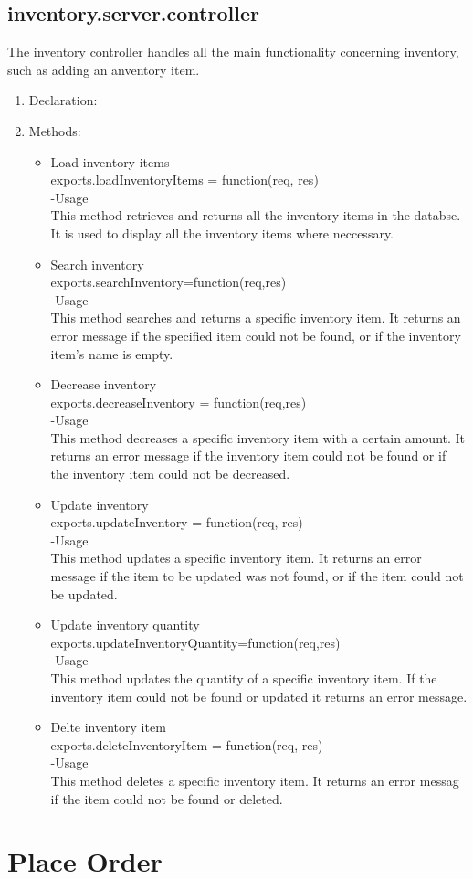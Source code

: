 \documentclass[a4paper,12pt]{article}
\begin{document}
\subsection{inventory.server.controller}
 The inventory controller handles all the main functionality concerning inventory, such as adding an anventory item.
 \begin{enumerate}
 \item Declaration:
 \item Methods:
 	\begin{itemize}
 	\item Load inventory items\\
 	exports.loadInventoryItems = function(req, res)\\
 	-Usage\\
 	This method retrieves and returns all the inventory items in the databse. It is used to display all the inventory items where neccessary.
 	\item Search inventory\\
 	exports.searchInventory=function(req,res)\\
 	-Usage\\
 	This method searches and returns a specific inventory item. It returns an error message if the specified item could not be found, or if the inventory item's name is empty.
 	\item Decrease inventory\\
 	exports.decreaseInventory = function(req,res)\\
 	-Usage\\
 	This method decreases a specific inventory item with a certain amount. It returns an error message if the inventory item could not be found or if the inventory item could not be decreased.
 	\item Update inventory\\
 	exports.updateInventory = function(req, res)\\
 	-Usage\\
 	This method updates a specific inventory item. It returns an error message if the item to be updated was  not found, or if the item could not be updated.
 	\item Update inventory quantity
 	exports.updateInventoryQuantity=function(req,res)\\
 	-Usage\\
 	This method updates the quantity of a specific inventory item. If the inventory item could not be found or updated it returns an error message.
 	\item Delte inventory item\\
 	exports.deleteInventoryItem = function(req, res)\\
 	-Usage\\
 	This method deletes a specific inventory item. It returns an error messag if the item could not be found or deleted.
 	\end{itemize}
 \end{enumerate}
\section{Place Order}


  
\end{document}
